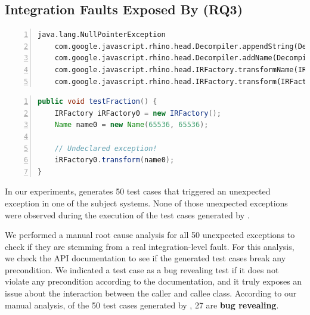\subsection{Integration Faults Exposed By \integration (RQ3)}

\begin{lstlisting}[frame=tb,
    caption={Exception captured only by \integration in Closure},
    label=list:divzero,
    captionpos=t,
    numbers=left,
    float=t,
    belowskip=-2.5em,
    firstnumber=1]
    java.lang.NullPointerException
    com.google.javascript.rhino.head.Decompiler.appendString(Decompiler.java:226)
    com.google.javascript.rhino.head.Decompiler.addName(Decompiler.java:156)
    com.google.javascript.rhino.head.IRFactory.transformName(IRFactory.java:833)
    com.google.javascript.rhino.head.IRFactory.transform(IRFactory.java:157)
\end{lstlisting}

\begin{lstlisting}[frame=tb,
    caption={\cling test case triggering the crash in Listing~\ref{list:divzero}},
    label=list:testdivzero,
    language=java,
    captionpos=t,
    numbers=left,
    float=t,
    belowskip=-2.5em,
    firstnumber=1]
public void testFraction() {
    IRFactory iRFactory0 = new IRFactory();
    Name name0 = new Name(65536, 65536);

    // Undeclared exception!
    iRFactory0.transform(name0);
}
\end{lstlisting}

In our experiments, \integration generates 50 test cases that triggered an unexpected exception in one of the subject systems. 
None of those unexpected exceptions were observed during the execution of the test cases generated by \evosuite.

We performed a manual root cause analysis for all 50 unexpected exceptions to check if they are stemming from a real integration-level fault. For this analysis, we check the API documentation to see if the generated test cases break any precondition. We indicated a test case as a bug revealing test if it does not violate any precondition according to the documentation, and it truly exposes an issue about the interaction between the caller and callee class. According to our manual analysis, of the 50 test cases generated by \cling, 27 are \textbf{bug revealing}.


